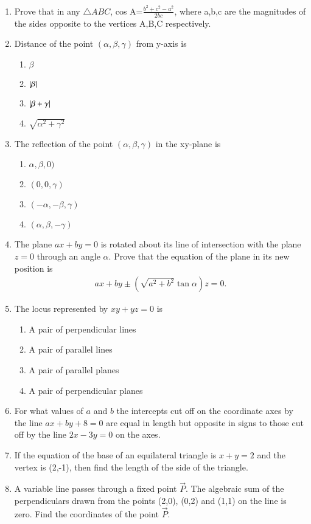 \begin{enumerate}[label=\thesubsection.\arabic*,ref=\thesubsection.\theenumi]
\item Prove that in any $\triangle{ABC}$, cos A=$\frac{b^2+c^2-a^2}{2bc}$, where a,b,c are the magnitudes of the sides opposite to the vertices A,B,C respectively.
\item Distance of the point $(\alpha, \beta, \gamma)$ from y-axis is
\begin{enumerate}
	\item $\beta$ 
	\item $\left\vert\beta\right\vert$
	\item $\left\vert\beta+\gamma\right\vert$
	\item $\sqrt{\alpha^2+\gamma^2}$
\end{enumerate}
\item The reflection of the point $(\alpha, \beta, \gamma )$ in the xy-plane is 
\begin{enumerate}
	\item $\alpha,\beta,0)$
	\item $(0,0,\gamma)$
	\item $(-\alpha,-\beta,\gamma)$
	\item $(\alpha,\beta,-\gamma)$
\end{enumerate}
\item The plane $ax+by=0$ is rotated about its line of intersection with the plane $z=0$ through an angle $\alpha.$ Prove that the equation of the plane in its new position is 
\begin{align*}
	ax+by \pm (\sqrt{a^2+b^2} \tan\alpha)z=0.
\end{align*}
\item The locus represented by $xy+yz=0$ is 
\begin{enumerate}
	\item A pair of perpendicular lines
	\item A pair of parallel lines
	\item A pair of parallel planes 
	\item A pair of perpendicular planes
\end{enumerate}
\item For what values of $a$ and $b$ the intercepts cut off on the coordinate axes by the line $ax+by+8=0$ are equal in length but opposite in signs to those cut off by the line $2x-3y=0$ on the axes.
\item If the equation of the base of an equilateral triangle is $x+y=2$ and the vertex is (2,-1), then find the length of the side of the triangle. 
\item A variable line passes through a fixed point $\vec{P}$. The algebraic sum of the perpendiculars drawn from the points (2,0), (0,2) and (1,1) on the line is zero. Find the coordinates of the point $\vec{P}$.  

\end{enumerate}
